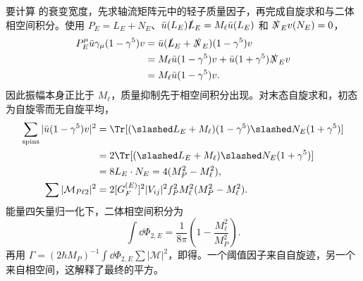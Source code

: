 \begin{derivation}[赝标量介子轻子衰变的质量抑制]
要计算 的衰变宽度，先求轴流矩阵元中的轻子质量因子，再完成自旋求和与二体相空间积分。使用 $P_E=L_E+N_E$、$\bar u(L_E)\slashed L_E=M_\ell\bar u(L_E)$ 和 $\slashed N_Ev(N_E)=0$，
\begin{align*}
 P_E^\mu\bar u\gamma_\mu(1-\gamma^5)v
 &=\bar u(\slashed L_E+\slashed N_E)(1-\gamma^5)v\\
 &=M_\ell\bar u(1-\gamma^5)v
 +\bar u(1+\gamma^5)\slashed N_Ev\\
 &=M_\ell\bar u(1-\gamma^5)v.
\end{align*}
因此振幅本身正比于 $M_\ell$，质量抑制先于相空间积分出现。对末态自旋求和，初态为自旋零而无自旋平均，
\begin{align*}
 \sum_{\rm spins}|\bar u(1-\gamma^5)v|^2
 &=\Tr[(\slashed L_E+M_\ell)(1-\gamma^5)
 \slashed N_E(1+\gamma^5)]\\
 &=2\Tr[(\slashed L_E+M_\ell)\slashed N_E(1+\gamma^5)]\\
 &=8L_E\cdot N_E=4(M_P^2-M_\ell^2),\\
 \sum|\mathcal M_{P\ell2}|^2
 &=2[G_F^{(E)}]^2|V_{ij}|^2f_P^2M_\ell^2(M_P^2-M_\ell^2).
\end{align*}
能量四矢量归一化下，二体相空间积分为
\begin{equation*}
 \int\dd\Phi_{2,E}=\frac{1}{8\pi}\left(1-\frac{M_\ell^2}{M_P^2}\right).
\end{equation*}
再用 $\Gamma=(2\hbar M_P)^{-1}\int\dd\Phi_{2,E}\sum|\mathcal M|^2$，即得。一个阈值因子来自自旋迹，另一个来自相空间，这解释了最终的平方。
\end{derivation}

